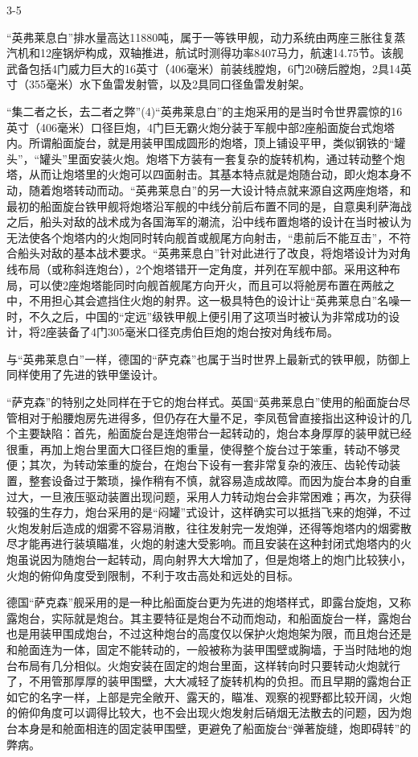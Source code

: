 \documentclass[12pt,UTF8]{ctexbook}
\begin{document}
3-5

“英弗莱息白”排水量高达11880吨，属于一等铁甲舰，动力系统由两座三胀往复蒸汽机和12座锅炉构成，双轴推进，航试时测得功率8407马力，航速14.75节。该舰武备包括4门威力巨大的16英寸（406毫米）前装线膛炮，6门20磅后膛炮，2具14英寸（355毫米）水下鱼雷发射管，以及2具同口径鱼雷发射架。

“集二者之长，去二者之弊”(4)“英弗莱息白”的主炮采用的是当时令世界震惊的16英寸（406毫米）口径巨炮，4门巨无霸火炮分装于军舰中部2座船面旋台式炮塔内。所谓船面旋台，就是用装甲围成圆形的炮塔，顶上铺设平甲，类似钢铁的“罐头”，“罐头”里面安装火炮。炮塔下方装有一套复杂的旋转机构，通过转动整个炮塔，从而让炮塔里的火炮可以四面射击。其基本特点就是炮随台动，即火炮本身不动，随着炮塔转动而动。“英弗莱息白”的另一大设计特点就来源自这两座炮塔，和最初的船面旋台铁甲舰将炮塔沿军舰的中线分前后布置不同的是，自意奥利萨海战之后，船头对敌的战术成为各国海军的潮流，沿中线布置炮塔的设计在当时被认为无法使各个炮塔内的火炮同时转向舰首或舰尾方向射击，“患前后不能互击”，不符合船头对敌的基本战术要求。“英弗莱息白”针对此进行了改良，将炮塔设计为对角线布局（或称斜连炮台），2个炮塔错开一定角度，并列在军舰中部。采用这种布局，可以使2座炮塔能同时向舰首舰尾方向开火，而且可以将舱房布置在两舷之中，不用担心其会遮挡住火炮的射界。这一极具特色的设计让“英弗莱息白”名噪一时，不久之后，中国的“定远”级铁甲舰上便引用了这项当时被认为非常成功的设计，将2座装备了4门305毫米口径克虏伯巨炮的炮台按对角线布局。

与“英弗莱息白”一样，德国的“萨克森”也属于当时世界上最新式的铁甲舰，防御上同样使用了先进的铁甲堡设计。

“萨克森”的特别之处同样在于它的炮台样式。英国“英弗莱息白”使用的船面旋台尽管相对于船腰炮房先进得多，但仍存在大量不足，李凤苞曾直接指出这种设计的几个主要缺陷：首先，船面旋台是连炮带台一起转动的，炮台本身厚厚的装甲就已经很重，再加上炮台里面大口径巨炮的重量，使得整个旋台过于笨重，转动不够灵便；其次，为转动笨重的旋台，在炮台下设有一套非常复杂的液压、齿轮传动装置，整套设备过于繁琐，操作稍有不慎，就容易造成故障。而因为旋台本身的自重过大，一旦液压驱动装置出现问题，采用人力转动炮台会非常困难；再次，为获得较强的生存力，炮台采用的是“闷罐”式设计，这样确实可以抵挡飞来的炮弹，不过火炮发射后造成的烟雾不容易消散，往往发射完一发炮弹，还得等炮塔内的烟雾散尽才能再进行装填瞄准，火炮的射速大受影响。而且安装在这种封闭式炮塔内的火炮虽说因为随炮台一起转动，周向射界大大增加了，但是炮塔上的炮门比较狭小，火炮的俯仰角度受到限制，不利于攻击高处和远处的目标。

德国“萨克森”舰采用的是一种比船面旋台更为先进的炮塔样式，即露台旋炮，又称露炮台，实际就是炮台。其主要特征是炮台不动而炮动，和船面旋台一样，露炮台也是用装甲围成炮台，不过这种炮台的高度仅以保护火炮炮架为限，而且炮台还是和舱面连为一体，固定不能转动的，一般被称为装甲围壁或胸墙，于当时陆地的炮台布局有几分相似。火炮安装在固定的炮台里面，这样转向时只要转动火炮就行了，不用管那厚厚的装甲围壁，大大减轻了旋转机构的负担。而且早期的露炮台正如它的名字一样，上部是完全敞开、露天的，瞄准、观察的视野都比较开阔，火炮的俯仰角度可以调得比较大，也不会出现火炮发射后硝烟无法散去的问题，因为炮台本身是和舱面相连的固定装甲围壁，更避免了船面旋台“弹著旋缝，炮即碍转”的弊病。
\end{document}
